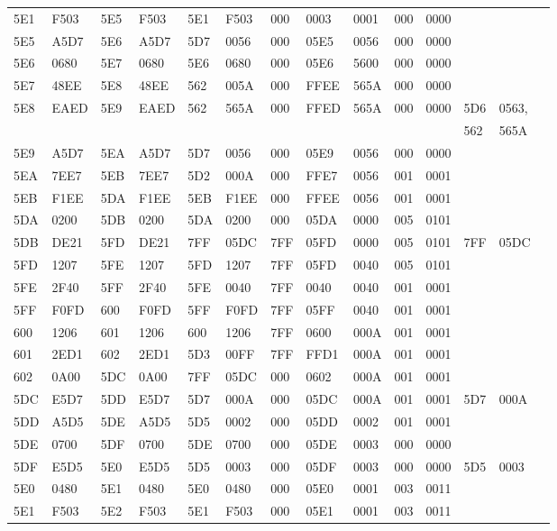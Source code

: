 \begin{tabular}{|*{14}{l|}}
5E1 & F503 & 5E5 & F503 & 5E1 & F503 & 000 & 0003 & 0001 & 000 & 0000 & &\\
5E5 & A5D7 & 5E6 & A5D7 & 5D7 & 0056 & 000 & 05E5 & 0056 & 000 & 0000 & &\\
5E6 & 0680 & 5E7 & 0680 & 5E6 & 0680 & 000 & 05E6 & 5600 & 000 & 0000 & &\\
5E7 & 48EE & 5E8 & 48EE & 562 & 005A & 000 & FFEE & 565A & 000 & 0000 & &\\
5E8 & EAED & 5E9 & EAED & 562 & 565A & 000 & FFED & 565A & 000 & 0000 & 5D6 & 0563,\\
    &      &     &      &     &      &     &      &      &     &      & 562	& 565A\\
5E9 & A5D7 & 5EA & A5D7 & 5D7 & 0056 & 000 & 05E9 & 0056 & 000 & 0000 & &\\
5EA & 7EE7 & 5EB & 7EE7 & 5D2 & 000A & 000 & FFE7 & 0056 & 001 & 0001 & &\\
5EB & F1EE & 5DA & F1EE & 5EB & F1EE & 000 & FFEE & 0056 & 001 & 0001 & &\\
5DA & 0200 & 5DB & 0200 & 5DA & 0200 & 000 & 05DA & 0000 & 005 & 0101 & &\\
5DB & DE21 & 5FD & DE21 & 7FF & 05DC & 7FF & 05FD & 0000 & 005 & 0101 & 7FF & 05DC\\
5FD & 1207 & 5FE & 1207 & 5FD & 1207 & 7FF & 05FD & 0040 & 005 & 0101 & &\\
5FE & 2F40 & 5FF & 2F40 & 5FE & 0040 & 7FF & 0040 & 0040 & 001 & 0001 & &\\
5FF & F0FD & 600 & F0FD & 5FF & F0FD & 7FF & 05FF & 0040 & 001 & 0001 & &\\
600 & 1206 & 601 & 1206 & 600 & 1206 & 7FF & 0600 & 000A & 001 & 0001 & &\\
601 & 2ED1 & 602 & 2ED1 & 5D3 & 00FF & 7FF & FFD1 & 000A & 001 & 0001 & &\\
602 & 0A00 & 5DC & 0A00 & 7FF & 05DC & 000 & 0602 & 000A & 001 & 0001 & &\\
5DC & E5D7 & 5DD & E5D7 & 5D7 & 000A & 000 & 05DC & 000A & 001 & 0001 & 5D7 & 000A\\
5DD & A5D5 & 5DE & A5D5 & 5D5 & 0002 & 000 & 05DD & 0002 & 001 & 0001 & &\\
5DE & 0700 & 5DF & 0700 & 5DE & 0700 & 000 & 05DE & 0003 & 000 & 0000 & &\\
5DF & E5D5 & 5E0 & E5D5 & 5D5 & 0003 & 000 & 05DF & 0003 & 000 & 0000 & 5D5 & 0003\\
5E0 & 0480 & 5E1 & 0480 & 5E0 & 0480 & 000 & 05E0 & 0001 & 003 & 0011 & &\\
5E1 & F503 & 5E2 & F503 & 5E1 & F503 & 000 & 05E1 & 0001 & 003 & 0011 & &\\

\end{tabular}

